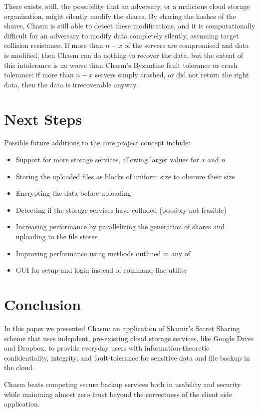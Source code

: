 \documentclass[letterpaper,twocolumn,10pt]{article}
\begin{document}
There exists, still, the possibility that an adversary, or a malicious cloud storage organization, might silently modify the shares. By sharing the hashes of the shares, Chasm is still able to detect these modifications, and it is computationally difficult for an adversary to modify data completely silently, assuming target collision resistance. If more than $n - x$ of the servers are compromised and data is modified, then Chasm can do nothing to recover the data, but the extent of this intolerance is no worse than Chasm's Byzantine fault tolerance or crash tolerance: if more than $n - x$ servers simply crashed, or did not return the right data, then the data is irrecoverable anyway.

\section{Next Steps}
Possible future additions to the core project concept include:

\begin{itemize}
	\item Support for more storage services, allowing larger values for $x$ and $n$
    \item Storing the uploaded files as blocks of uniform size to obscure their size
    \item Encrypting the data before uploading
    \item Detecting if the storage services have colluded (possibly not feasible)
    \item Increasing performance by parallelizing the generation of shares and uploading to the file stores
    \item Improving performance using methods outlined in any of \cite{subbiah, reiter, greenan}
    \item GUI for setup and login instead of command-line utility
\end{itemize}

\section{Conclusion}
In this paper we presented Chasm: an application of Shamir's Secret Sharing scheme that uses indepdent, pre-existing cloud storage services, like Google Drive and Dropbox, to provide everyday users with information-theoretic confidentiality, integrity, and fault-tolerance for sensitive data and file backup in the cloud.

Chasm beats competing secure backup services both in usability and security while maintaing almost zero trust beyond the correctness of the client side application.
\end{document}
